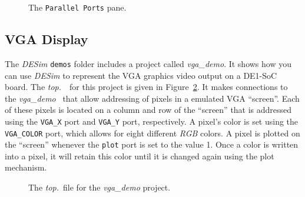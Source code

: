 {\begin{figure}[h]
	\begin{center}
        \setlength{\fboxsep}{0pt}
	\end{center}
          \caption{The \texttt{Parallel Ports} pane.}
	\label{fig:gpio_pane}
\end{figure}

\subsection{VGA Display}

The {\it DESim} \texttt{demos} folder includes a project called {\it vga\_demo}. It shows how 
you can use {\it DESim} to represent the VGA graphics video output on a DE1-SoC board.
The {\it top.\hdlFileExt}~\hdlModuleName~for this project is given in Figure~\ref{fig:vga}. It makes
connections to the {\it vga\_demo} \hdlModuleName~that allow addressing of pixels in a
emulated VGA ``screen''. Each of these pixels is located on a column and row of the 
``screen'' that is addressed using the \texttt{VGA\_X} port and \texttt{VGA\_Y} port,
respectively. A pixel's color is set using the \texttt{VGA\_COLOR} port, which allows for 
eight different {\it RGB} colors.  A pixel is plotted on the ``screen'' whenever the 
\texttt{plot} port is set to the value 1. Once a color is written into a pixel, it will
retain this color until it is changed again using the plot mechanism.

\begin{figure}[h]
\begin{center}
\begin{minipage}[h]{16 cm}
\ifverilog
    \ifnotSV
        
    \else
        
    \fi
\else
	
\fi
\end{minipage}
	\caption{The {\it top.\hdlFileExt}~file for the {\it vga\_demo} project.}
	\label{fig:vga}
\end{center}
\end{figure}

}
